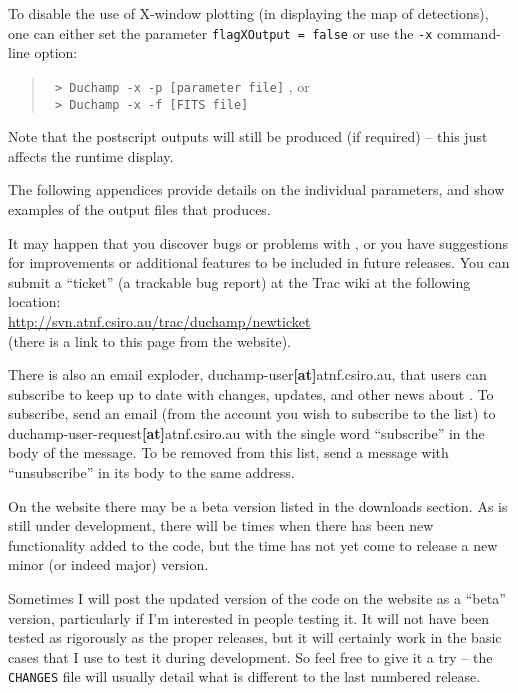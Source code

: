 To disable the use of X-window plotting (in displaying the map of
detections), one can either set the parameter \texttt{flagXOutput =
false} or use the \texttt{-x} command-line option:
\begin{quote}
{\footnotesize
\verb| > Duchamp -x -p [parameter file]|
}, or\\
{\footnotesize
\verb| > Duchamp -x -f [FITS file]|
}
\end{quote}
Note that the postscript outputs will still be produced (if required)
-- this just affects the runtime display.

The following appendices provide details on the individual parameters,
and show examples of the output files that \duchamp produces.

It may happen that you discover bugs or problems with \duchamp, or you
have suggestions for improvements or additional features to be
included in future releases. You can submit a ``ticket'' (a trackable
bug report) at the \duchamp Trac wiki at the following location:\\
\href{http://svn.atnf.csiro.au/trac/duchamp/newticket}%
{http://svn.atnf.csiro.au/trac/duchamp/newticket}
\\(there is a link to this page from the \duchamp website).

There is also an email exploder, duchamp-user\textbf{[at]}atnf.csiro.au,
that users can subscribe to keep up to date with changes, updates, and
other news about \duchamp. To subscribe, send an email (from the
account you wish to subscribe to the list) to
duchamp-user-request\textbf{[at]}atnf.csiro.au with the single word
``subscribe'' in the body of the message. To be removed from this
list, send a message with ``unsubscribe'' in its body to the same
address.


On the \duchamp website there may be a beta version listed in the
downloads section. As \duchamp is still under development, there will
be times when there has been new functionality added to the code, but
the time has not yet come to release a new minor (or indeed major)
version. 

Sometimes I will post the updated version of the code on the website
as a ``beta'' version, particularly if I'm interested in people
testing it. It will not have been tested as rigorously as the proper
releases, but it will certainly work in the basic cases that I use to
test it during development. So feel free to give it a try -- the
\texttt{CHANGES} file will usually detail what is different to the last
numbered release.

